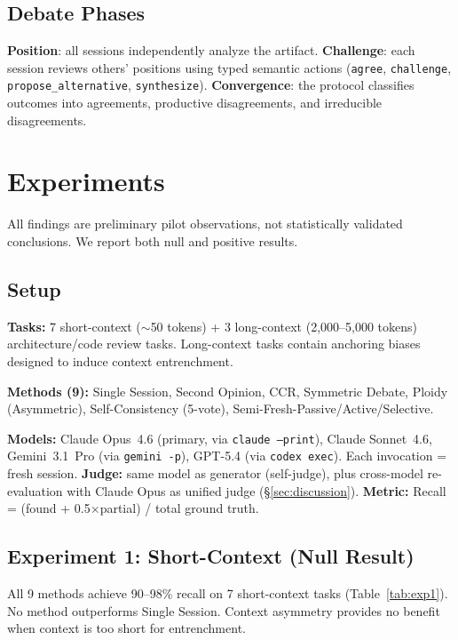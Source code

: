 \documentclass{article}
\begin{document}
\subsection{Debate Phases}

\textbf{Position}: all sessions independently analyze the artifact. \textbf{Challenge}: each session reviews others' positions using typed semantic actions (\texttt{agree}, \texttt{challenge}, \texttt{propose\_alternative}, \texttt{synthesize}). \textbf{Convergence}: the protocol classifies outcomes into agreements, productive disagreements, and irreducible disagreements.

\section{Experiments}
\label{sec:experiments}

All findings are preliminary pilot observations, not statistically validated conclusions. We report both null and positive results.

\subsection{Setup}
\label{sec:setup}

\textbf{Tasks:} 7 short-context ($\sim$50 tokens) + 3 long-context (2,000--5,000 tokens) architecture/code review tasks. Long-context tasks contain anchoring biases designed to induce context entrenchment.

\textbf{Methods (9):} Single Session, Second Opinion, CCR, Symmetric Debate, Ploidy (Asymmetric), Self-Consistency (5-vote), Semi-Fresh-Passive/Active/Selective.

\textbf{Models:} Claude Opus~4.6 (primary, via \texttt{claude --print}), Claude Sonnet~4.6, Gemini~3.1~Pro (via \texttt{gemini -p}), GPT-5.4 (via \texttt{codex exec}). Each invocation = fresh session. \textbf{Judge:} same model as generator (self-judge), plus cross-model re-evaluation with Claude Opus as unified judge (\S\ref{sec:discussion}). \textbf{Metric:} Recall = (found + 0.5$\times$partial) / total ground truth.

\subsection{Experiment 1: Short-Context (Null Result)}

All 9 methods achieve 90--98\% recall on 7 short-context tasks (Table~\ref{tab:exp1}). No method outperforms Single Session. Context asymmetry provides no benefit when context is too short for entrenchment.
\end{document}

